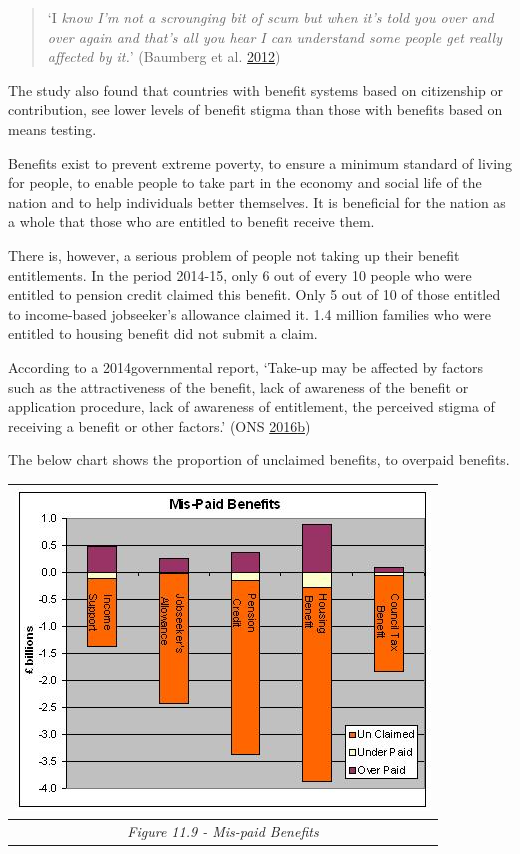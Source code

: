 \documentclass[]{tufte-handout}
\begin{document}
\begin{quote}
`I \emph{know I'm not a scrounging bit of scum but when it's told you
over and over again and that's all you hear I can understand some people
get really affected by it.}' (Baumberg et al.
\protect\hyperlink{ref-Baumberg2012}{2012})
\end{quote}

The study also found that countries with benefit systems based on
citizenship or contribution, see lower levels of benefit stigma than
those with benefits based on means testing.

Benefits exist to prevent extreme poverty, to ensure a minimum standard
of living for people, to enable people to take part in the economy and
social life of the nation and to help individuals better themselves. It
is beneficial for the nation as a whole that those who are entitled to
benefit receive them.

There is, however, a serious problem of people not taking up their
benefit entitlements. In the period 2014-15, only 6 out of every 10
people who were entitled to pension credit claimed this benefit. Only 5
out of 10 of those entitled to income-based jobseeker's allowance
claimed it. 1.4 million families who were entitled to housing benefit
did not submit a claim.

According to a 2014governmental report, `Take-up may be affected by
factors such as the attractiveness of the benefit, lack of awareness of
the benefit or application procedure, lack of awareness of entitlement,
the perceived stigma of receiving a benefit or other factors.' (ONS
\protect\hyperlink{ref-ONS2016c}{2016}\protect\hyperlink{ref-ONS2016c}{b})

The below chart shows the proportion of unclaimed benefits, to overpaid
benefits.

\begin{longtable}[]{@{}c@{}}
\toprule
\includegraphics{ChapterPictures/11-9-MispaidBenefits.png}\tabularnewline
\midrule
\endhead
\emph{Figure 11.9 - Mis-paid Benefits }\tabularnewline
\bottomrule
\end{longtable}
\end{document}
